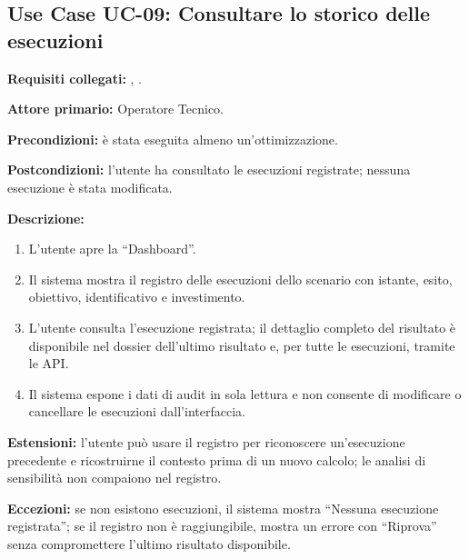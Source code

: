 \subsection*{Use Case UC-09: Consultare lo storico delle esecuzioni}
\textbf{Requisiti collegati:} , .\par
\textbf{Attore primario:} Operatore Tecnico.\par
\textbf{Precondizioni:} è stata eseguita almeno un'ottimizzazione.\par
\textbf{Postcondizioni:} l'utente ha consultato le esecuzioni registrate; nessuna esecuzione è stata modificata.\par
\textbf{Descrizione:}
\begin{enumerate}[leftmargin=1.6em, itemsep=0.1em]
    \item L'utente apre la ``Dashboard''.
    \item Il sistema mostra il registro delle esecuzioni dello scenario con istante, esito, obiettivo, identificativo e investimento.
    \item L'utente consulta l'esecuzione registrata; il dettaglio completo del risultato è disponibile nel dossier dell'ultimo risultato e, per tutte le esecuzioni, tramite le API.
    \item Il sistema espone i dati di audit in sola lettura e non consente di modificare o cancellare le esecuzioni dall'interfaccia.
\end{enumerate}
\textbf{Estensioni:} l'utente può usare il registro per riconoscere un'esecuzione precedente e ricostruirne il contesto prima di un nuovo calcolo; le analisi di sensibilità non compaiono nel registro.\par
\textbf{Eccezioni:} se non esistono esecuzioni, il sistema mostra ``Nessuna esecuzione registrata''; se il registro non è raggiungibile, mostra un errore con ``Riprova'' senza compromettere l'ultimo risultato disponibile.

